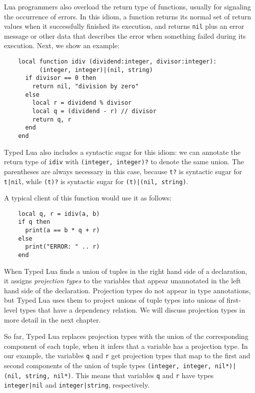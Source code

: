 Lua programmers also overload the return type of functions,
usually for signaling the occurrence of errors.
In this idiom, a function returns its normal set of return values
when it successfully finished its execution,
and returns \texttt{nil} plus an error message or other data that
describes the error when something failed during its execution.
Next, we show an example:
\begin{verbatim}
    local function idiv (dividend:integer, divisor:integer):
          (integer, integer)|(nil, string)
      if divisor == 0 then
        return nil, "division by zero"
      else
        local r = dividend % divisor
        local q = (dividend - r) // divisor
        return q, r
      end 
    end
\end{verbatim}

Typed Lua also includes a syntactic sugar for this idiom:
we can annotate the return type of \texttt{idiv} with
\texttt{(integer, integer)?} to denote the same union.
The parentheses are always necessary in this case, because
\texttt{t?} is syntactic sugar for \texttt{t|nil},
while \texttt{(t)?} is syntactic sugar for \texttt{(t)|(nil, string)}.

A typical client of this function would use it as follows:
\begin{verbatim}
    local q, r = idiv(a, b)
    if q then
      print(a == b * q + r)
    else
      print("ERROR: " .. r)
    end
\end{verbatim}

When Typed Lua finds a union of tuples in the right hand side of
a declaration, it assigns \emph{projection types} to the
variables that appear unannotated in the left hand side of the
declaration.
Projection types do not appear in type annotations, but Typed Lua
uses them to project unions of tuple types into unions of
first-level types that have a dependency relation.
We will discuss projection types in more detail in the next chapter.

So far, Typed Lua replaces projection types with the union of the
corresponding component of each tuple, when it infers that a variable
has a projection type.
In our example, the variables \texttt{q} and \texttt{r} get projection
types that map to the first and second components of the union of
tuple types \texttt{(integer, integer, nil*)|(nil, string, nil*)}.
This means that variables \texttt{q} and \texttt{r} have types
\texttt{integer|nil} and \texttt{integer|string}, respectively.

